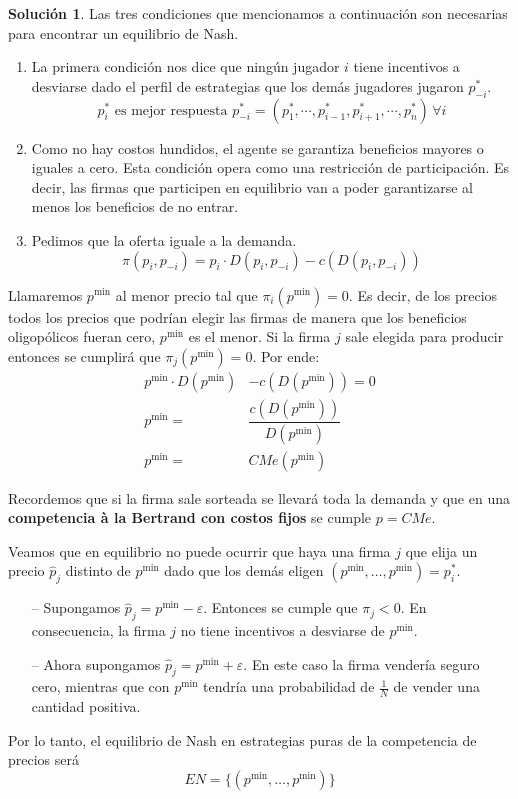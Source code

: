 \documentclass[a4paper, 11pt]{article}
\theoremstyle{definition}
\newtheorem{solucion}{Soluci\'on}
\begin{document}
\begin{solucion}
\vspace{6pt}
Las tres condiciones que mencionamos a continuación son necesarias para encontrar un equilibrio de Nash.

\begin{enumerate}
\item 
La primera condición nos dice que ningún jugador $i$ tiene incentivos a desviarse dado el perfil de estrategias que los demás jugadores jugaron $p_{-i}^*$.
\[p_i^* \text{ es mejor respuesta } p_{-i}^*=(p_1^*,\cdots, p_{i-1}^*,p_{i+1}^*,\cdots,p_n^*) \, \forall i\]

\item Como no hay costos hundidos, el agente se garantiza beneficios mayores o iguales a cero. Esta condición opera como una restricción de participación. Es decir, las firmas que participen en equilibrio van a poder garantizarse al menos los beneficios de no entrar.
\item
Pedimos que la oferta iguale a la demanda.
\vspace*{-8pt}
\[\pi(p_i,p_{-i})=p_i \cdot D(p_i, p_{-i})-c(D(p_i, p_{-i}))\]
\end{enumerate}
\vspace*{-8pt}
Llamaremos $p^{\min{}}$ al menor precio tal que $\pi_i(p^{\min{}})=0$. Es decir, de los precios todos los precios que podrían elegir las firmas de manera que los beneficios oligopólicos fueran cero, $p^{\min{}}$ es el menor. Si la firma $j$ sale elegida para producir entonces se cumplirá que $\pi_j(p^{\min{}})=0$. Por ende:
\begin{align*}
p^{\min{}}\cdot D(p^{\min{}})&-c(D(p^{\min{}}))=0\\
p^{\min{}}=&\dfrac{c(D(p^{\min{}}))}{D(p^{\min{}})}\\
p^{\min{}}=&CMe(p^{\min{}})
\end{align*}

Recordemos que si la firma sale sorteada se llevará toda la demanda y que en una \textbf{competencia à la Bertrand con costos fijos} se cumple $p=CMe$.

Veamos que en equilibrio no puede ocurrir que haya una firma $j$ que elija un precio $\hat{p}_j$ distinto de $p^{\min{}}$ dado que los demás eligen $(p^{\min{}}, \dotsc , p^{\min{}})= p_i^*$.

\begin{itemize}
    \item[--] Supongamos $\hat{p}_j=p^{\min{}}-\varepsilon$. Entonces se cumple que $\pi_j<0$. En consecuencia, la firma $j$ no tiene incentivos a desviarse de $p^{\min{}}$.
    \item[--] Ahora supongamos $\hat{p}_j=p^{\min{}}+\varepsilon$. En este caso la firma vendería seguro cero, mientras que con $p^{\min{}}$ tendría una probabilidad de $\frac{1}{N}$ de vender una cantidad positiva.
\end{itemize}
Por lo tanto, el equilibrio de Nash en estrategias puras de la competencia de precios será
\vspace*{-8pt}
\[ EN=\{(p^{\min{}},\dotsc ,p^{\min{}})\}\]


\end{solucion}
\end{document}
